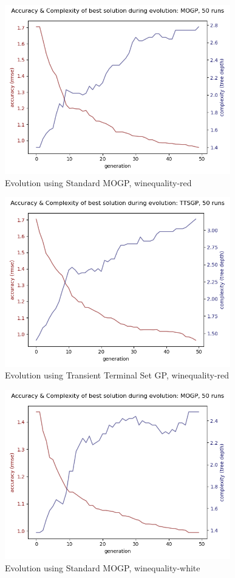 \documentclass[a4paper]{article}
\begin{document}
\begin{figure}[H]
	\caption{Evolution using Standard MOGP, winequality-red}
	\centering
	\includegraphics[width=0.875\textwidth]{winequality-red-evo-MOGP}
\end{figure}
\begin{figure}[H]
	\caption{Evolution using Transient Terminal Set GP, winequality-red}
	\centering
	\includegraphics[width=0.875\textwidth]{winequality-red-evo-TTSGP}
\end{figure}
\begin{figure}[H]
	\caption{Evolution using Standard MOGP, winequality-white}
	\centering
	\includegraphics[width=0.875\textwidth]{winequality-white-evo-MOGP}
\end{figure}
\end{document}
